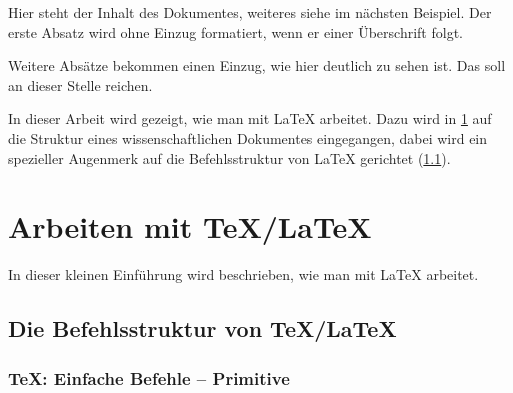 \documentclass[ngerman,               %
               a4paper,               %
               fleqn,                 %
                     ]{scrreprt}
\begin{document}
  Hier steht der Inhalt des Dokumentes, weiteres siehe im n\"achsten
  Beispiel. Der erste Absatz wird ohne Einzug formatiert, wenn er einer \"Uberschrift folgt.

  Weitere Absätze bekommen einen Einzug, wie hier deutlich zu sehen ist.
  Das soll an dieser Stelle reichen.

  In dieser Arbeit wird gezeigt, wie man mit \LaTeX{} arbeitet. Dazu
  wird in \cref{chap:TeX} auf die Struktur eines wissenschaftlichen
  Dokumentes eingegangen, dabei wird ein spezieller Augenmerk auf die
  Befehlsstruktur von \LaTeX{} gerichtet (\cref{sec:befehlsstruktur}).


  \chapter{Arbeiten mit \TeX/\LaTeX}%
  \label{chap:TeX}                  %

  In dieser kleinen Einführung wird beschrieben, wie man mit \LaTeX{} arbeitet.

  \section[Die Befehlsstruktur]{Die Befehlsstruktur von \TeX/\LaTeX}%
  \label{sec:befehlsstruktur}

  \subsection{\TeX: Einfache Befehle -- Primitive} %
\end{document}
